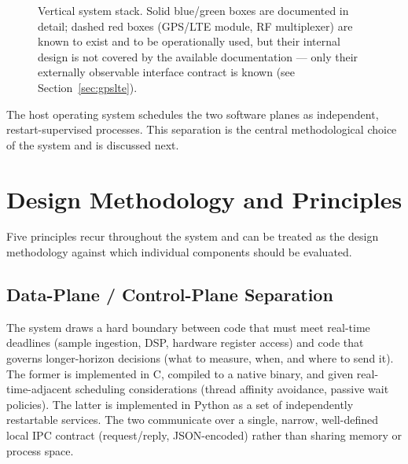 \documentclass[11pt,a4paper]{article}
\begin{document}
\begin{figure}[h]
\caption{Vertical system stack. Solid blue/green boxes are documented in detail; dashed red
boxes (GPS/LTE module, RF multiplexer) are known to exist and to be operationally used, but
their internal design is not covered by the available documentation --- only their externally
observable interface contract is known (see Section~\ref{sec:gpslte}).}
\label{fig:stack}
\end{figure}

The host operating system schedules the two software planes as independent, restart-supervised
processes. This separation is the central methodological choice of the system and is discussed
next.

\section{Design Methodology and Principles}
\label{sec:methodology}

Five principles recur throughout the system and can be treated as the design methodology
against which individual components should be evaluated.

\subsection{Data-Plane / Control-Plane Separation}

The system draws a hard boundary between code that must meet real-time deadlines (sample
ingestion, DSP, hardware register access) and code that governs longer-horizon decisions
(what to measure, when, and where to send it). The former is implemented in C, compiled to a
native binary, and given real-time-adjacent scheduling considerations (thread affinity
avoidance, passive wait policies). The latter is implemented in Python as a set of
independently restartable services. The two communicate over a single, narrow, well-defined
local IPC contract (request/reply, JSON-encoded) rather than sharing memory or process space.
\end{document}
